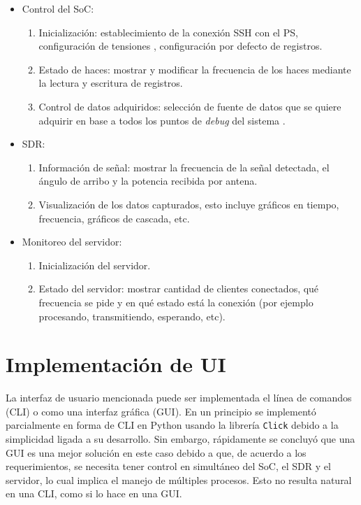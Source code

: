 \documentclass[../../main.tex]{subfiles}
\begin{document}
\begin{itemize}
    \item Control del SoC:
    \begin{enumerate}
        \item Inicialización: establecimiento de la conexión SSH con el PS, configuración de tensiones , configuración por defecto de registros.
        \item Estado de haces: mostrar y modificar la frecuencia de los haces mediante la lectura y escritura de registros.
        \item Control de datos adquiridos: selección de fuente de datos que se quiere adquirir en base a todos los puntos de \textit{debug} del sistema .
    \end{enumerate}
    \item SDR:
    \begin{enumerate}
        \item Información de señal: mostrar la frecuencia de la señal detectada, el ángulo de arribo  y la potencia recibida por antena.
        \item Visualización de los datos capturados, esto incluye gráficos en tiempo, frecuencia, gráficos de cascada, etc.
    \end{enumerate}
    \item Monitoreo del servidor:
    \begin{enumerate}
        \item Inicialización del servidor.
        \item Estado del servidor: mostrar cantidad de clientes conectados, qué frecuencia se pide y en qué estado está la conexión (por ejemplo procesando, transmitiendo, esperando, etc).
    \end{enumerate}
\end{itemize}

\section{Implementación de UI}
La interfaz de usuario mencionada puede ser implementada el línea de comandos (CLI) o como una interfaz gráfica (GUI).  En un principio se implementó parcialmente en forma de CLI en Python usando la librería \texttt{Click} \cite{click} debido a la simplicidad ligada a su desarrollo. Sin embargo, rápidamente se concluyó que una GUI es una mejor solución en este caso debido a que, de acuerdo a los requerimientos, se necesita tener control en simultáneo del SoC, el SDR y el servidor, lo cual implica el manejo de múltiples procesos. Esto no resulta natural en una CLI, como si lo hace en una GUI.
\end{document}
